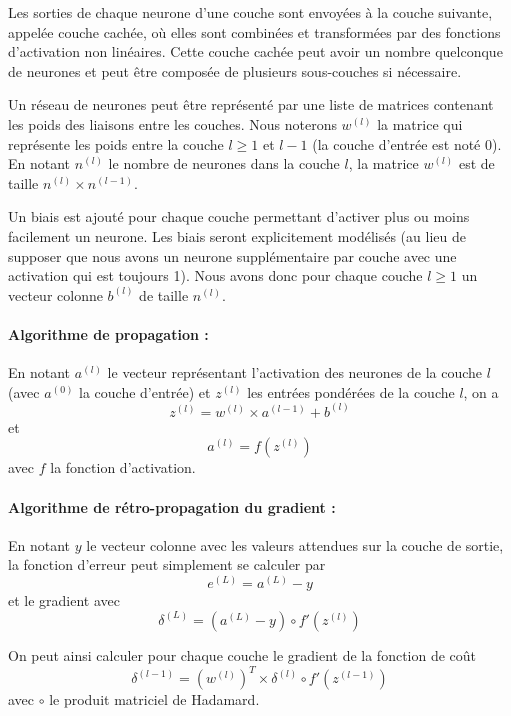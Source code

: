 \documentclass[11pt]{paper}
\begin{document}
Les sorties de chaque neurone d'une couche sont envoyées à la couche suivante, appelée couche cachée, où elles sont combinées et transformées par des fonctions d'activation non linéaires. Cette couche cachée peut avoir un nombre quelconque de neurones et peut être composée de plusieurs sous-couches si nécessaire.

Un réseau de neurones peut être représenté par une liste de matrices contenant les poids des liaisons entre les couches. Nous noterons $w^{(l)}$ la matrice qui représente les poids entre la couche $l \geq 1$ et $l-1$ (la couche d'entrée est noté 0). En notant $n^{(l)}$ le nombre de neurones dans la couche $l$, la matrice $w^{(l)}$ est de taille $n^{(l)} \times n^{(l-1)}$.

Un biais est ajouté pour chaque couche permettant d'activer plus ou moins facilement un neurone. Les biais seront explicitement modélisés (au lieu de supposer que nous avons un neurone supplémentaire par couche avec une activation qui est toujours 1). Nous avons donc pour chaque couche $l\geq 1$ un vecteur colonne $b^{(l)}$ de taille $n^{(l)}$.

\paragraph{Algorithme de propagation :}

En notant $a^{(l)}$ le vecteur représentant l'activation des neurones de la couche $l$ (avec $a^{(0)}$ la couche d'entrée) et $z^{(l)}$ les entrées pondérées de la couche $l$, on a  $$z^{(l)} = w^{(l)} \times a^{(l-1)} + b^{(l)}$$ et  $$a^{(l)} = f \left (z^{(l)} \right)$$ avec $f$ la fonction d'activation.

\paragraph{Algorithme de rétro-propagation du gradient :}

En notant $y$ le vecteur colonne avec les valeurs attendues sur la couche de sortie, la fonction d'erreur peut simplement se calculer par $$e^{(L)} = a^{(L)} - y$$ et le gradient avec $$\delta^{(L)} = (a^{(L)} - y)  \circ f'(z^{(l)})$$

On peut ainsi calculer pour chaque couche le gradient de la fonction de coût $$\delta^{(l-1)} = (w^{(l)})^T \times \delta^{(l)} \circ f'(z^{(l-1)})$$ avec $\circ$ le produit matriciel de Hadamard.
\end{document}
